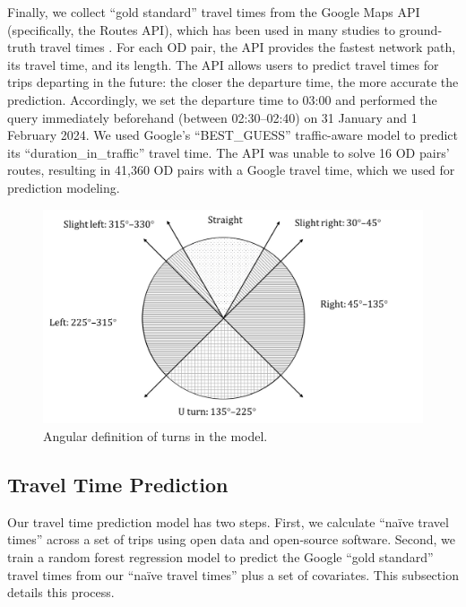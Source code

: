 \documentclass[12pt,letterpaper]{article} %
\begin{document}
Finally, we collect \enquote{gold standard} travel times from the Google Maps API (specifically, the Routes API), which has been used in many studies to ground-truth travel times  \citep[e.g.,][]{ludwig2023traffic, hu2020estimating, wang2011estimating, fu2023comparative, delmelle2019travel}. For each OD pair, the API provides the fastest network path, its travel time, and its length. The API allows users to predict travel times for trips departing in the future: the closer the departure time, the more accurate the prediction. Accordingly, we set the departure time to 03:00 and performed the query immediately beforehand (between 02:30--02:40) on 31 January and 1 February 2024. We used Google's \enquote{BEST\_GUESS} traffic-aware model to predict its \enquote{duration\_in\_traffic} travel time. The API was unable to solve 16 OD pairs' routes, resulting in 41,360 OD pairs with a Google travel time, which we used for prediction modeling.

\begin{figure}[hbt!]
    \centering
    \includegraphics[width=1.0\textwidth]{fig_turns_definition.jpg}
    \caption{Angular definition of turns in the model.}\label{fig:turns_definition}
\end{figure}

\subsection{Travel Time Prediction}

Our travel time prediction model has two steps. First, we calculate \enquote{naïve travel times} across a set of trips using open data and open-source software. Second, we train a random forest regression model to predict the Google \enquote{gold standard} travel times from our \enquote{naïve travel times} plus a set of covariates. This subsection details this process.
\end{document}
